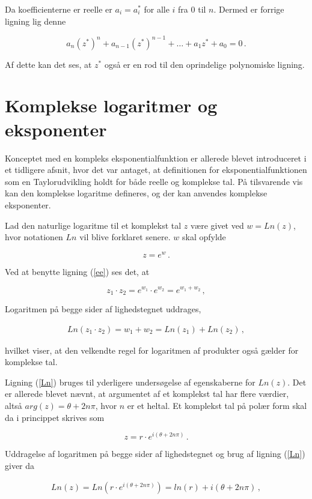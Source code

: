 \documentclass[a4paper, 12pt,titlepage]{article}
\begin{document}
Da koefficienterne er reelle er \(a_i = a_i^*\) for alle \(i\) fra \(0\) til \(n\). Dermed er forrige ligning lig denne

$$a_n (z^*)^n + a_{n-1} (z^*)^{n-1} + \dots + a_1 z^* +a_0 =0\,.$$

Af dette kan det ses, at \(z^*\) også er en rod til den oprindelige polynomiske ligning.

\section{Komplekse logaritmer og eksponenter}
\label{sec:org0f94610}

Konceptet med en kompleks eksponentialfunktion er allerede blevet introduceret i et tidligere afsnit, hvor det var antaget, at definitionen for eksponentialfunktionen som en Taylorudvikling holdt for både reelle og komplekse tal. På tilsvarende vis kan den komplekse logaritme defineres, og der kan anvendes komplekse eksponenter.

Lad den naturlige logaritme til et komplekst tal \(z\) være givet ved \(w=Ln (z)\), hvor notationen \(Ln\) vil blive forklaret senere. \(w\) skal opfylde

$$z = e^w\,.$$

Ved at benytte ligning (\ref{ee}) ses det, at

$$z_1\cdot z_2 = e^{w_1} \cdot e^{w_2} = e^{w_1 + w_2}\,,$$

Logaritmen på begge sider af lighedstegnet uddrages,

\begin{align}
\label{Ln}
Ln (z_1 \cdot z_2 ) = w_1 + w_2 = Ln (z_1) + Ln (z_2)\,,
\end{align}

hvilket viser, at den velkendte regel for logaritmen af produkter også gælder for komplekse tal. 

Ligning (\ref{Ln}) bruges til yderligere undersøgelse af egenskaberne for \(Ln (z)\). Det er allerede blevet nævnt, at argumentet af et komplekst tal har flere værdier, altså \(arg(z) = \theta + 2 n \pi\), hvor \(n\) er et heltal. Et komplekst tal på polær form skal da i princippet skrives som

$$z= r \cdot e^{i(\theta + 2 n \pi)}\,.$$

Uddragelse af logaritmen på begge sider af lighedstegnet og brug af ligning (\ref{Ln}) giver da

\begin{align}
\label{Ln2}
    Ln (z) = Ln \left(r \cdot e^{i(\theta + 2 n \pi)} \right) = ln(r) + i(\theta + 2 n \pi)\,, 
\end{align}
\end{document}
